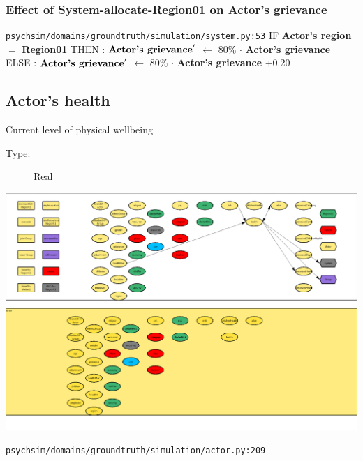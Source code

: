 \documentclass{article}%
\begin{document}
\subsubsection{Effect of System{-}allocate{-}Region01 on Actor's grievance}%
\label{ssubsec:Effect of System{-}allocate{-}Region01 on Actor's grievance}%
\begin{flushleft}%
\verb|psychsim/domains/groundtruth/simulation/system.py:53|%
\linebreak%
IF %
\textbf{Actor's region}%
$=$%
\textbf{Region01}%
\linebreak%
\hspace*{2em}%
THEN %
: %
$\mbox{\textbf{Actor's grievance}} '$%
$\leftarrow$%
80\%%
$\cdot$%
\textbf{Actor's grievance}%
\linebreak%
\hspace*{2em}%
ELSE %
: %
$\mbox{\textbf{Actor's grievance}} '$%
$\leftarrow$%
80\%%
$\cdot$%
\textbf{Actor's grievance}%
+0.20%
\end{flushleft}

%
\subsection{Actor's health}%
\label{subsec:Actor's health}%
Current level of physical wellbeing%
\begin{description}%
\item[Type:]%
Real%
\end{description}%
\includegraphics[width=\textwidth]{images/healthOfActor.png}%
\begin{flushleft}%
\verb|psychsim/domains/groundtruth/simulation/actor.py:209|%
\end{flushleft}%
\end{document}
